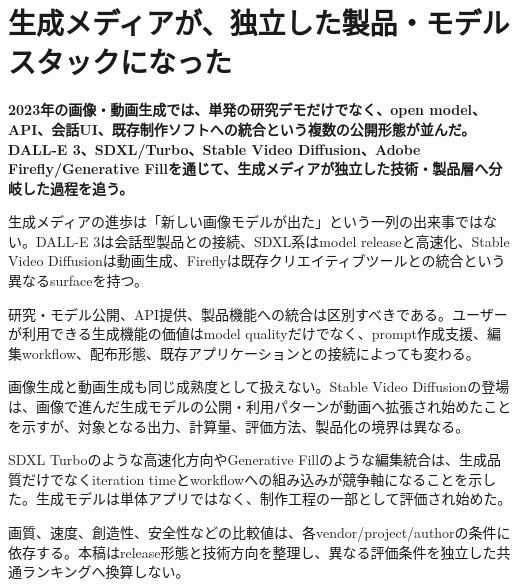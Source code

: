 \section{生成メディアが、独立した製品・モデルスタックになった}
\label{pkg:generative-media}
\noindent\textbf{2023年の画像・動画生成では、単発の研究デモだけでなく、open model、API、会話UI、既存制作ソフトへの統合という複数の公開形態が並んだ。DALL-E 3、SDXL/Turbo、Stable Video Diffusion、Adobe Firefly/Generative Fillを通じて、生成メディアが独立した技術・製品層へ分岐した過程を追う。}\autocite{src-091bbe9dbf4e,src-096341c0ccf6,src-0b410c70bfc7,src-18f22707bf78,src-2b694ab9a461,src-2c97fc5583a3,src-317afaba6510,src-9bc8e7751f80,src-9da0d929aa45,src-a4f61fbe35c5,src-ba80e5e27a11,src-e79065444906}

生成メディアの進歩は「新しい画像モデルが出た」という一列の出来事ではない。DALL-E 3は会話型製品との接続、SDXL系はmodel releaseと高速化、Stable Video Diffusionは動画生成、Fireflyは既存クリエイティブツールとの統合という異なるsurfaceを持つ。\autocite{src-091bbe9dbf4e,src-096341c0ccf6,src-0b410c70bfc7,src-18f22707bf78,src-2b694ab9a461,src-2c97fc5583a3,src-317afaba6510,src-9bc8e7751f80,src-9da0d929aa45,src-a4f61fbe35c5,src-ba80e5e27a11,src-e79065444906}


研究・モデル公開、API提供、製品機能への統合は区別すべきである。ユーザーが利用できる生成機能の価値はmodel qualityだけでなく、prompt作成支援、編集workflow、配布形態、既存アプリケーションとの接続によっても変わる。\autocite{src-091bbe9dbf4e,src-18f22707bf78,src-2b694ab9a461,src-317afaba6510,src-9bc8e7751f80,src-9da0d929aa45,src-a4f61fbe35c5,src-ba80e5e27a11,src-e79065444906}


画像生成と動画生成も同じ成熟度として扱えない。Stable Video Diffusionの登場は、画像で進んだ生成モデルの公開・利用パターンが動画へ拡張され始めたことを示すが、対象となる出力、計算量、評価方法、製品化の境界は異なる。\autocite{src-091bbe9dbf4e,src-096341c0ccf6,src-0b410c70bfc7,src-18f22707bf78,src-2c97fc5583a3,src-317afaba6510,src-9da0d929aa45,src-e79065444906}


SDXL Turboのような高速化方向やGenerative Fillのような編集統合は、生成品質だけでなくiteration timeとworkflowへの組み込みが競争軸になることを示した。生成モデルは単体アプリではなく、制作工程の一部として評価され始めた。\autocite{src-091bbe9dbf4e,src-18f22707bf78,src-2b694ab9a461,src-317afaba6510,src-9da0d929aa45,src-a4f61fbe35c5,src-e79065444906}


\begin{claimboundary}
画質、速度、創造性、安全性などの比較値は、各vendor/project/authorの条件に依存する。本稿はrelease形態と技術方向を整理し、異なる評価条件を独立した共通ランキングへ換算しない。\autocite{src-9bc8e7751f80,src-ba80e5e27a11}
\end{claimboundary}
